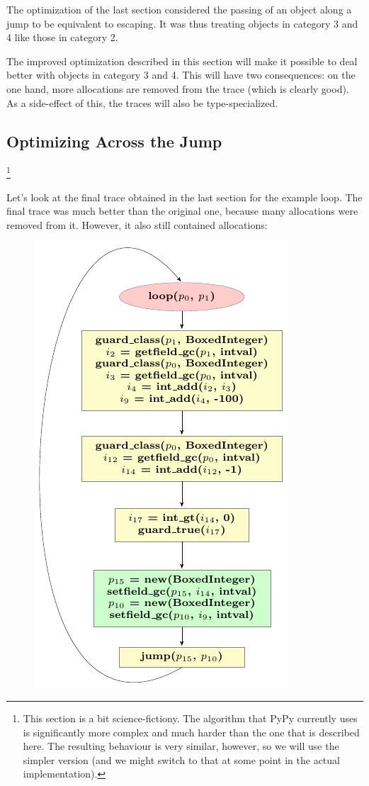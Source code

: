 \documentclass{sigplanconf}
\begin{document}
The optimization of the last section considered the passing of an object along a
jump to be equivalent to escaping. It was thus treating objects in category 3
and 4 like those in category 2.

The improved optimization described in this section will make it possible to deal
better with objects in category 3 and 4. This will have two consequences: on
the one hand, more allocations are removed from the trace (which is clearly
good). As a side-effect of this, the traces will also be type-specialized.



\subsection{Optimizing Across the Jump}

\footnote{This section is a bit
science-fictiony. The algorithm that PyPy currently uses is significantly more
complex and much harder than the one that is described here. The resulting
behaviour is very similar, however, so we will use the simpler version (and we
might switch to that at some point in the actual implementation).}

Let's look at the final trace obtained in the last section for the example loop.
The final trace was much better than the original one, because many allocations
were removed from it. However, it also still contained allocations:

\begin{figure}
\includegraphics{figures/step1.pdf}
\end{figure}
\end{document}
